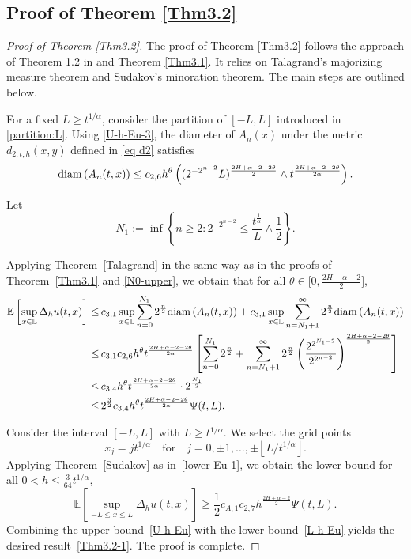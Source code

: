 \documentclass[11pt,reqno]{amsart}
\numberwithin{equation}{section}
\def\EE{\mathbb{E}}
\def\bL{\mathbb{L}}
\newcommand\diam { {\rm{diam\,}}}
\newcommand{\1}{{\bf 1}}
\newcommand{\2}{{\bf 2}}
\newcommand{\lc}{\left(}
\newcommand{\rc}{\right)}
\newcommand{\lk}{\left[}
\newcommand{\rk}{\right]}
\begin{document}
\subsection{Proof of  Theorem  \ref{Thm3.2}}
\begin{proof}[Proof of  Theorem  \ref{Thm3.2}] 
The proof of Theorem \ref{Thm3.2} follows the approach of  Theorem 1.2 in \cite{HW2022} and   Theorem \ref{Thm3.1}. It relies on       Talagrand's majorizing measure theorem and Sudakov's minoration theorem.  The main steps are outlined below.

  For a fixed $L \geq t^{1/\alpha}$,  consider the partition of $[-L, L]$  introduced  in \eqref{partition:L}. Using    \eqref{U-h-Eu-3},   the diameter of $A_n(x)$ under the metric $d_{2,t,h}(x,y)$ defined in \eqref{eq d2}  satisfies 
\[
\diam(A_n(t,x))\le c_{2,6}h^{\theta}\lc (2^{-2^{n-2}}L)^{\frac{2H+\alpha-2-2\theta}{2}}\wedge t^{\frac{2H+\alpha-2-2\theta}{2\alpha}}\rc.
\]

 Let
 \begin{equation}\label{def:N1}
 N_1:=\inf\left\{n\geq2: 2^{-2^{n-2}}\leq \frac{ t^{\frac{1}{\alpha}} } { L}\wedge\frac12\right\}.
 \end{equation}

 Applying Theorem~\ref{Talagrand} in the same way as in the proofs of Theorem~\ref{Thm3.1} and   \eqref{N0-upper}, we obtain that for all  $\theta\in\Big[0,\frac{2H+\alpha-2}{2}\Big]$,
\begin{equation}\label{U-h-Eu}
\begin{split}
  \EE\lk\sup_{x\in\bL}\Delta_h u(t,x)\rk 
\leq&\, c_{3,1}\sup_{x\in\bL}\sum_{n=0}^{N_1}2^{\frac{n}{2}}\diam(A_n(t,x))
    +c_{3,1}\sup_{x\in\bL}\sum_{n= N_1+1}^{\infty}2^{\frac{n}{2}} \diam(A_n(t,x)) \\
\leq&\,  c_{3,1}c_{2,6}h^{\theta}t^{\frac{2H+\alpha-2-2\theta}{2\alpha}}
\left[ \sum_{n=0}^{N_1}2^{\frac{n}{2}}+\sum_{n=N_1+1}^{\infty}2^{\frac{n}{2}}
\left( \frac{2^{2^{N_1-2}}}{2^{2^{n-2}}}\right)^{\frac{2H+\alpha-2-2\theta}{2}}  \right] \\
\leq&\, c_{3,4}h^{\theta}t^{\frac{2H+\alpha-2-2\theta}{2\alpha}}\cdot2^{\frac{N_1}{2}} \\
\leq&\, 2^{\frac32}c_{3,4}h^{\theta}t^{\frac{2H+\alpha-2-2\theta}{2\alpha}}\Psi(t,L).
\end{split}
\end{equation}

Consider the interval $[-L, L]$ with $L \geq t^{1/\alpha}$.  We select the grid points
\[
x_j = j t^{1/\alpha}  \quad \text{for} \quad j = 0, \pm 1, \ldots, \pm\left\lfloor L/t^{1/\alpha} \right\rfloor.
\]
Applying Theorem~\ref{Sudakov} as in~\eqref{lower-Eu-1}, we obtain the lower bound for all  $0 < h \leq \frac{3}{64}t^{1/\alpha}$,
\begin{equation}\label{L-h-Eu}
\mathbb{E}\left[\sup_{-L \leq x \leq L} \Delta_h u(t,x)\right] \geq \frac{1}{2}c_{A,1}c_{2,7}h^{\frac{2H+\alpha-2}{2}}\Psi(t,L).
\end{equation}
Combining the upper bound~\eqref{U-h-Eu} with the lower bound~\eqref{L-h-Eu} yields the desired result~\eqref{Thm3.2-1}. The  proof is complete.
\end{proof}
\end{document}
